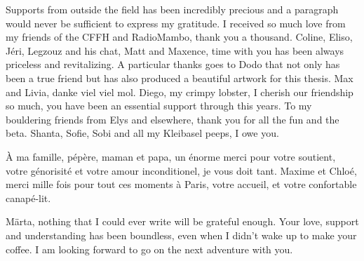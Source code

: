 \medbreak

Supports from outside the field has been incredibly precious and a paragraph would never be sufficient to express my gratitude.
I received so much love from my friends of the CFFH and RadioMambo, thank you a thousand.
Coline, Eliso, Jéri, Legzouz and his chat, Matt and Maxence, time with you has been always priceless and revitalizing.
A particular thanks goes to Dodo that not only has been a true friend but has also produced a beautiful artwork for this thesis.
Max and Livia, danke viel viel mol. 
Diego, my crimpy lobster, I cherish our friendship so much, you have been an essential support through this years.
To my bouldering friends from Elys and elsewhere, thank you for all the fun and the beta.
Shanta, Sofie, Sobi and all my Kleibasel peeps, I owe you.

\medbreak


À ma famille, pépère, maman et papa, un énorme merci pour votre soutient, votre génorisité et votre amour inconditionel, je vous doit tant.
Maxime et Chloé, merci mille fois pour tout ces moments à Paris, votre accueil, et votre confortable canapé-lit.

\medbreak

Märta, nothing that I could ever write will be grateful enough.
Your love, support and understanding has been boundless, even when I didn't wake up to make your coffee.
I am looking forward to go on the next adventure with you.

